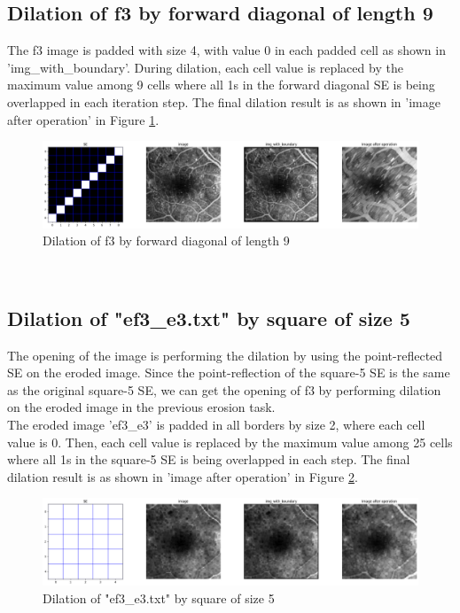 \documentclass{article}
\begin{document}
\subsection{Dilation of f3 by forward diagonal of length 9}
The f3 image is padded with size 4, with value 0 in each padded cell as shown in 'img\_with\_boundary'. During dilation, each cell value is replaced by the maximum value among 9 cells where all 1s in the forward diagonal SE is being overlapped in each iteration step. The final dilation result is as shown in 'image after operation' in Figure \ref{fig:df3_d5}.\\
\begin{figure}[h!]
\includegraphics[width=\linewidth]{images/df3_d5.png}
\caption{Dilation of f3 by forward diagonal of length 9}
\label{fig:df3_d5}
\end{figure}
\\ 

\subsection{Dilation of "ef3\_e3.txt" by square of size 5}
The opening of the image is performing the dilation by using the point-reflected SE on the eroded image. Since the point-reflection of the square-5 SE is the same as the original square-5 SE, we can get the opening of f3 by performing dilation on the eroded image in the previous erosion task. \\
The eroded image 'ef3\_e3' is padded in all borders by size 2, where each cell value is 0. Then,  each cell value is replaced by the maximum value among 25 cells where all 1s in the square-5 SE is being overlapped in each step. The final dilation result is as shown in 'image after operation' in Figure \ref{fig:of3_o3}.\\
\begin{figure}[h!]
\includegraphics[width=\linewidth]{images/of3_o3.png}
\caption{Dilation of "ef3\_e3.txt" by square of size 5}
\label{fig:of3_o3}
\end{figure}
\\ 
\end{document}
